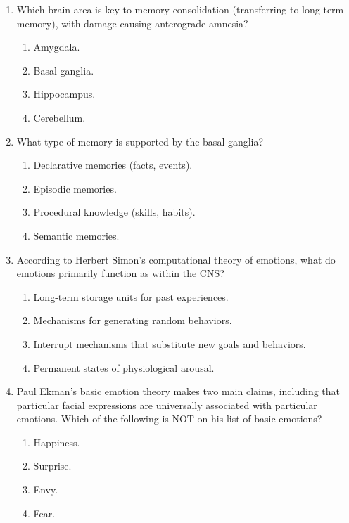 \documentclass{article}
\begin{document}
\begin{enumerate}[label=\arabic*.]
\item Which brain area is key to memory consolidation (transferring to long-term memory), with damage causing anterograde amnesia?
\begin{enumerate}[label=(\alph*)]
    \item Amygdala.
    \item Basal ganglia.
    \item Hippocampus.
    \item Cerebellum.
\end{enumerate}

\item What type of memory is supported by the basal ganglia?
\begin{enumerate}[label=(\alph*)]
    \item Declarative memories (facts, events).
    \item Episodic memories.
    \item Procedural knowledge (skills, habits).
    \item Semantic memories.
\end{enumerate}

\item According to Herbert Simon's computational theory of emotions, what do emotions primarily function as within the CNS?
\begin{enumerate}[label=(\alph*)]
    \item Long-term storage units for past experiences.
    \item Mechanisms for generating random behaviors.
    \item Interrupt mechanisms that substitute new goals and behaviors.
    \item Permanent states of physiological arousal.
\end{enumerate}

\item Paul Ekman's basic emotion theory makes two main claims, including that particular facial expressions are universally associated with particular emotions. Which of the following is NOT on his list of basic emotions?
\begin{enumerate}[label=(\alph*)]
    \item Happiness.
    \item Surprise.
    \item Envy.
    \item Fear.
\end{enumerate}


\end{enumerate}
\end{document}
